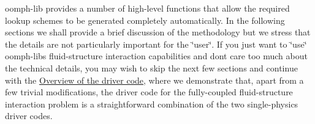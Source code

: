 {\ttfamily oomph-\/lib} provides a number of high-\/level functions that allow the required lookup schemes to be generated completely automatically. In the following sections we shall provide a brief discussion of the methodology but we stress that the details are not particularly important for the \char`\"{}user\char`\"{}. If you just want to \char`\"{}use\char`\"{} {\ttfamily oomph-\/lib\textquotesingle{}s} fluid-\/structure interaction capabilities and don\textquotesingle{}t care too much about the technical details, you may wish to skip the next few sections and continue with the \hyperlink{index_driver_code}{Overview of the driver code}, where we demonstrate that, apart from a few trivial modifications, the driver code for the fully-\/coupled fluid-\/structure interaction problem is a straightforward combination of the two single-\/physics driver codes.



 

